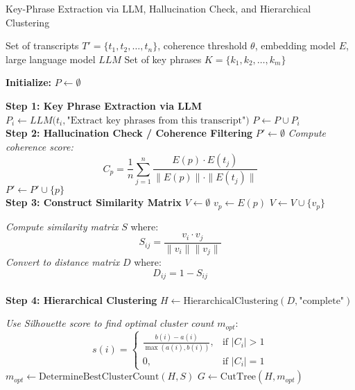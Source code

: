 \documentclass[11pt,a4paper]{article}
\begin{document}
\begin{algorithm}
    {\small
    \caption{Key-Phrase Extraction via LLM, Hallucination Check, and Hierarchical Clustering}
    \label{alg:key_phrase_extraction}
    \begin{algorithmic}
    \REQUIRE Set of transcripts $T' = \{t_1, t_2, \ldots, t_n\}$, coherence threshold $\theta$, embedding model $E$, large language model $LLM$
    \ENSURE Set of key phrases $K = \{k_1, k_2, \ldots, k_m\}$
    
    
    \STATE \textbf{Initialize:} $P \gets \emptyset$ 
    
    \STATE \textbf{Step 1: Key Phrase Extraction via LLM}
        \STATE $P_i \gets LLM\bigl(t_i,\text{"Extract key phrases from this transcript"}\bigr)$
        \STATE $P \gets P \cup P_i$ 
    \ENDFOR
    \\

    \STATE \textbf{Step 2: Hallucination Check / Coherence Filtering}
    \STATE $P' \gets \emptyset$ 
        \STATE \textit{Compute coherence score:}
        \[
            C_p = \frac{1}{n} \sum_{j=1}^{n} \frac{E(p) \cdot E(t_j)}{\|E(p)\| \cdot \|E(t_j)\|}
        \]
            \STATE $P' \gets P' \cup \{p\}$ 
        \ENDIF
    \ENDFOR
    \\


    \STATE \textbf{Step 3: Construct Similarity Matrix}
    \STATE $V \gets \emptyset$ 
        \STATE $v_p \gets E(p)$
        \STATE $V \gets V \cup \{v_p\}$
    \ENDFOR
    
    \STATE \textit{Compute similarity matrix} $S$ where:
    \[
        S_{ij} = \frac{v_i \cdot v_j}{\|v_i\|\|v_j\|}
    \]
    \STATE \textit{Convert to distance matrix} $D$ where:
    \[
        D_{ij} = 1 - S_{ij}
    \]
    \\


    \STATE \textbf{Step 4: Hierarchical Clustering}
    \STATE $H \gets \text{HierarchicalClustering}(D, \text{"complete"})$ 
    
    \STATE \textit{Use Silhouette score to find optimal cluster count $m_{opt}$}:
    \[
        s(i) = \begin{cases}
        \frac{b(i) - a(i)}{\max(a(i), b(i))}, & \text{if } |C_i|>1\\
        0, & \text{if } |C_i|=1
        \end{cases}
    \]
    \STATE $m_{opt} \gets \text{DetermineBestClusterCount}(H, S)$
    \STATE $G \gets \text{CutTree}(H, m_{opt})$ 
    



\end{algorithmic}}
\end{algorithm}
\end{document}

